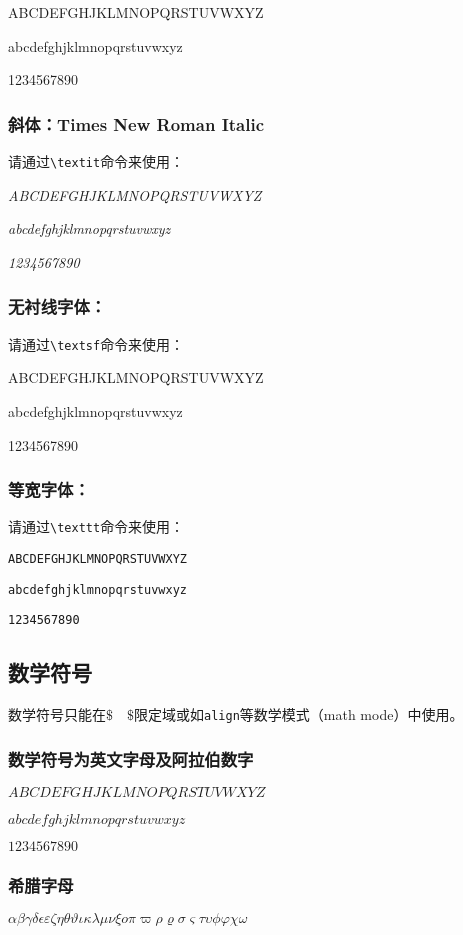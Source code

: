 ABCDEFGHJKLMNOPQRSTUVWXYZ 

abcdefghjklmnopqrstuvwxyz 

1234567890

\subsubsection{斜体：Times New Roman Italic}
请通过\texttt{\textbackslash textit}命令来使用：

\textit{ABCDEFGHJKLMNOPQRSTUVWXYZ}

\textit{abcdefghjklmnopqrstuvwxyz}

\textit{1234567890}

\subsubsection{无衬线字体：}
请通过\texttt{\textbackslash textsf}命令来使用：

\textsf{ABCDEFGHJKLMNOPQRSTUVWXYZ}

\textsf{abcdefghjklmnopqrstuvwxyz}

\textsf{1234567890}

\subsubsection{等宽字体：}
请通过\texttt{\textbackslash texttt}命令来使用：

\texttt{ABCDEFGHJKLMNOPQRSTUVWXYZ}

\texttt{abcdefghjklmnopqrstuvwxyz}

\texttt{1234567890}

\subsection{数学符号}
数学符号只能在$\$\quad\$$限定域或如\texttt{align}等数学模式（math mode）中使用。

\subsubsection{数学符号为英文字母及阿拉伯数字}
$ABCDEFGHJKLMNOPQRSTUVWXYZ$

$abcdefghjklmnopqrstuvwxyz$

$1234567890$

\subsubsection{希腊字母}
$\alpha\beta\gamma\delta\epsilon\varepsilon\zeta\eta\theta\vartheta\iota\kappa\lambda\mu\nu\xi o\pi\varpi\rho\varrho\sigma\varsigma\tau\upsilon\phi\varphi\chi\omega$

